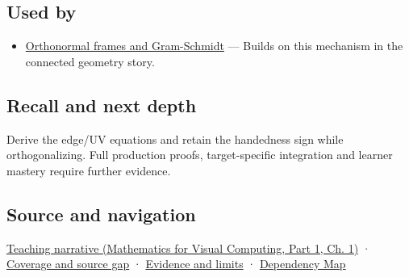 \subsection{Used by}\label{appendix-e31893dec985-used-by}

\hypertarget{appendix-e31893dec985-used-by}{}

\begin{itemize}
\tightlist
\item
  \hyperref[appendix-c39f1ed34271]{Orthonormal frames and Gram-Schmidt} --- Builds on this mechanism in the connected geometry story.
\end{itemize}

\subsection{Recall and next depth}\label{appendix-e31893dec985-recall-and-next-depth}

\hypertarget{appendix-e31893dec985-recall-and-next-depth}{}

Derive the edge/UV equations and retain the handedness sign while orthogonalizing. Full production proofs, target-specific integration and learner mastery require further evidence.

\subsection{Source and navigation}\label{appendix-e31893dec985-source-and-navigation}

\hypertarget{appendix-e31893dec985-source-and-navigation}{}

\href{../02-Mathematics-for-Visual-Computing-P01/main.pdf\#nameddest=01-foundations-i-ch017-surface-movement-becomes-a-local-frame}{Teaching narrative (Mathematics for Visual Computing, Part 1, Ch. 1)} · \hyperref[appendix-fd090d982a15-phase-6---parts-501-600]{Coverage and source gap} · \hyperref[appendix-a103e7846d21-phase-6---source-analysis-and-verification]{Evidence and limits} · \hyperref[appendix-4ad47bdd269a]{Dependency Map}
